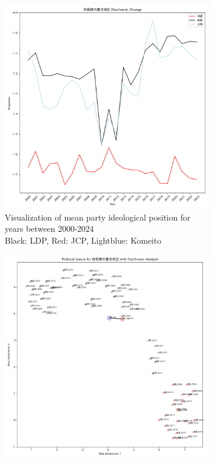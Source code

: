\documentclass[final,5p,times,twocolumn,authoryear]{elsarticle}
\begin{document}
\onecolumn

\begin{figure}[h]
	\centering
		\begin{subfigure}{0.48\textwidth}
		  \centering
		  \includegraphics[width=\textwidth]{figs/results/diachronic_defence/自衛隊の憲法明記_防衛_diachronic_change.png}
		  \caption{Visualization of mean party ideological position for years between 2000-2024 \\\hspace{\textwidth}Black: LDP, Red: JCP, Lightblue: Komeito}
		  \label{fig:sub1}
		\end{subfigure}
		\hfill
		\begin{subfigure}{0.48\textwidth}
		  \centering
		  \includegraphics[width=\textwidth]{figs/results/diachronic_defence/自衛隊の憲法明記_diachronic_umap.png}

\end{subfigure}
\end{figure}
\end{document}
